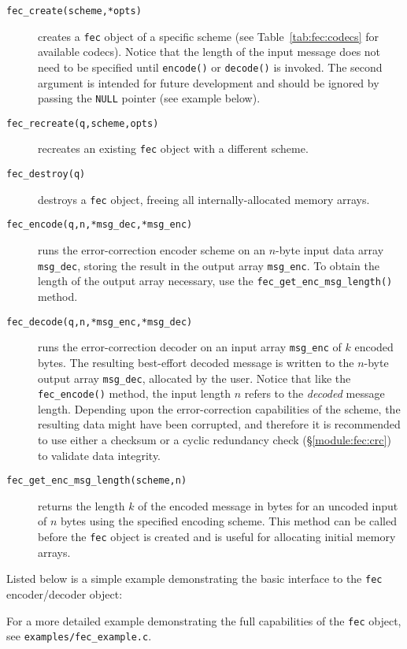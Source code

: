 \begin{description}
\item[{\tt fec\_create(scheme,*opts)}]
    creates a {\tt fec} object of a specific scheme
    (see Table~\ref{tab:fec:codecs} for available codecs).
    Notice that the length of the input message does not need to be
    specified until {\tt encode()} or {\tt decode()} is invoked.
    The second argument is intended for future development and should be
    ignored by passing the {\tt NULL} pointer
    (see example below).
\item[{\tt fec\_recreate(q,scheme,opts)}]
    recreates an existing {\tt fec} object with a different scheme.
\item[{\tt fec\_destroy(q)}]
    destroys a {\tt fec} object, freeing all internally-allocated memory
    arrays.
\item[{\tt fec\_encode(q,n,*msg\_dec,*msg\_enc)}]
    runs the error-correction encoder scheme on an $n$-byte input data
    array {\tt msg\_dec}, storing the result in the output array
    {\tt msg\_enc}.
    To obtain the length of the output array necessary, use the
    {\tt fec\_get\_enc\_msg\_length()} method.
\item[{\tt fec\_decode(q,n,*msg\_enc,*msg\_dec)}]
    runs the error-correction decoder on an input array
    {\tt msg\_enc} of $k$ encoded bytes.
    The resulting best-effort decoded message is written to the $n$-byte
    output array {\tt msg\_dec}, allocated by the user.
    Notice that like the {\tt fec\_encode()} method, the input length
    $n$ refers to the {\em decoded} message length.
    Depending upon the error-correction capabilities of the scheme, the
    resulting data might have been corrupted,
    and therefore it is recommended to use either a checksum or a
    cyclic redundancy check (\S\ref{module:fec:crc})
    to validate data integrity.
\item[{\tt fec\_get\_enc\_msg\_length(scheme,n)}]
    returns the length $k$ of the encoded message in bytes
    for an uncoded input of $n$ bytes using the specified encoding
    scheme.
    This method can be called before the {\tt fec} object is created and
    is useful for allocating initial memory arrays.
\end{description}
%
Listed below is a simple example demonstrating the basic interface to
the {\tt fec} encoder/decoder object:
%

%
For a more detailed example demonstrating the full capabilities of the
{\tt fec} object, see {\tt examples/fec\_example.c}.
%

